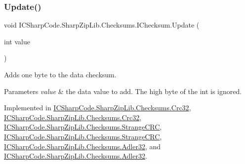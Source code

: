 \subsubsection{\texorpdfstring{Update()}{Update()}\hspace{0.1cm}{\footnotesize\ttfamily [2/6]}}
{\footnotesize\ttfamily void I\+C\+Sharp\+Code.\+Sharp\+Zip\+Lib.\+Checksums.\+I\+Checksum.\+Update (\begin{DoxyParamCaption}\item[{int}]{value }\end{DoxyParamCaption})}



Adds one byte to the data checksum. 


\begin{DoxyParams}{Parameters}
{\em value} & the data value to add. The high byte of the int is ignored. \\
\hline
\end{DoxyParams}


Implemented in \hyperlink{class_i_c_sharp_code_1_1_sharp_zip_lib_1_1_checksums_1_1_crc32_a7f5626219875b0291d1f54e5a7bdbeaa}{I\+C\+Sharp\+Code.\+Sharp\+Zip\+Lib.\+Checksums.\+Crc32}, \hyperlink{class_i_c_sharp_code_1_1_sharp_zip_lib_1_1_checksums_1_1_crc32_a7f5626219875b0291d1f54e5a7bdbeaa}{I\+C\+Sharp\+Code.\+Sharp\+Zip\+Lib.\+Checksums.\+Crc32}, \hyperlink{class_i_c_sharp_code_1_1_sharp_zip_lib_1_1_checksums_1_1_strange_c_r_c_a23b221cea3b706bd2e7c9fb8afb5786b}{I\+C\+Sharp\+Code.\+Sharp\+Zip\+Lib.\+Checksums.\+Strange\+C\+RC}, \hyperlink{class_i_c_sharp_code_1_1_sharp_zip_lib_1_1_checksums_1_1_strange_c_r_c_a23b221cea3b706bd2e7c9fb8afb5786b}{I\+C\+Sharp\+Code.\+Sharp\+Zip\+Lib.\+Checksums.\+Strange\+C\+RC}, \hyperlink{class_i_c_sharp_code_1_1_sharp_zip_lib_1_1_checksums_1_1_adler32_ae37b99f42678909be303136f2995b572}{I\+C\+Sharp\+Code.\+Sharp\+Zip\+Lib.\+Checksums.\+Adler32}, and \hyperlink{class_i_c_sharp_code_1_1_sharp_zip_lib_1_1_checksums_1_1_adler32_ae37b99f42678909be303136f2995b572}{I\+C\+Sharp\+Code.\+Sharp\+Zip\+Lib.\+Checksums.\+Adler32}.

\mbox{\label{interface_i_c_sharp_code_1_1_sharp_zip_lib_1_1_checksums_1_1_i_checksum_aee26d2b3705b22ab24cc9b5eb9dbc81d}} 
